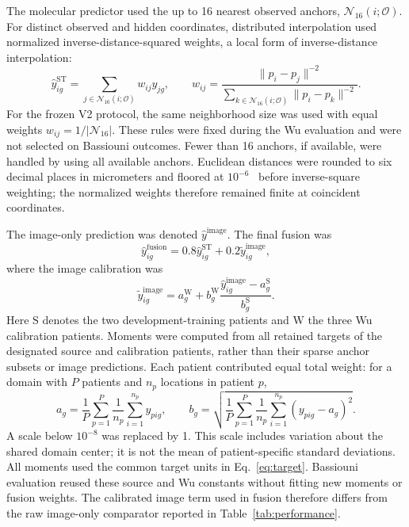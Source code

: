 The molecular predictor used the up to 16 nearest observed anchors, $\mathcal N_{16}(i;\mathcal O)$. For distinct observed and hidden coordinates, distributed interpolation used normalized inverse-distance-squared weights, a local form of inverse-distance interpolation\cite{shepard1968}:
\begin{equation}
 \widehat y_{ig}^{\mathrm{ST}}=\sum_{j\in\mathcal N_{16}(i;\mathcal O)}w_{ij}y_{jg},\qquad
 w_{ij}=\frac{\|p_i-p_j\|^{-2}}{\sum_{k\in\mathcal N_{16}(i;\mathcal O)}\|p_i-p_k\|^{-2}}.
 \label{eq:interp}
\end{equation}
For the frozen V2 protocol, the same neighborhood size was used with equal weights $w_{ij}=1/|\mathcal N_{16}|$. These rules were fixed during the Wu evaluation and were not selected on Bassiouni outcomes. Fewer than 16 anchors, if available, were handled by using all available anchors. Euclidean distances were rounded to six decimal places in micrometers and floored at $10^{-6}$~\um{} before inverse-square weighting; the normalized weights therefore remained finite at coincident coordinates.

The image-only prediction was denoted $\widehat y^{\mathrm{image}}$. The final fusion was
\begin{equation}
 \widehat y_{ig}^{\mathrm{fusion}}=0.8\widehat y_{ig}^{\mathrm{ST}}+
 0.2\widetilde y_{ig}^{\mathrm{image}},
 \label{eq:fusion}
\end{equation}
where the image calibration was
\begin{equation}
\widetilde y^{\mathrm{image}}_{ig}
=a^{\mathrm W}_g+b^{\mathrm W}_g
\frac{\widehat y^{\mathrm{image}}_{ig}-a^{\mathrm S}_g}{b^{\mathrm S}_g}.
\label{eq:calibration}
\end{equation}
Here $\mathrm S$ denotes the two development-training patients and $\mathrm W$ the three Wu calibration patients. Moments were computed from all retained targets of the designated source and calibration patients, rather than their sparse anchor subsets or image predictions. Each patient contributed equal total weight: for a domain with $P$ patients and $n_p$ locations in patient $p$,
\begin{equation}
 a_g=\frac{1}{P}\sum_{p=1}^{P}\frac{1}{n_p}\sum_{i=1}^{n_p}y_{pig},
 \qquad
 b_g=\sqrt{\frac{1}{P}\sum_{p=1}^{P}\frac{1}{n_p}\sum_{i=1}^{n_p}(y_{pig}-a_g)^2}.
\label{eq:moments}
\end{equation}
A scale below $10^{-8}$ was replaced by 1. This scale includes variation about the shared domain center; it is not the mean of patient-specific standard deviations. All moments used the common target units in Eq.~\ref{eq:target}. Bassiouni evaluation reused these source and Wu constants without fitting new moments or fusion weights. The calibrated image term used in fusion therefore differs from the raw image-only comparator reported in Table~\ref{tab:performance}.

